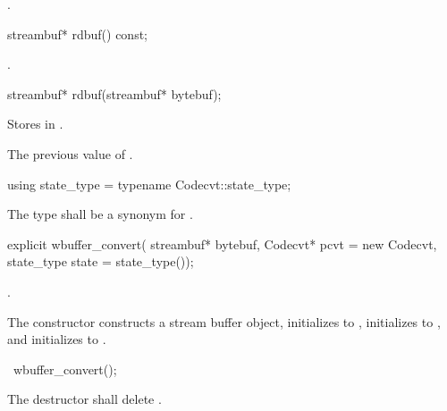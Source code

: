 \begin{itemdescr}
\pnum
\returns
{}.
\end{itemdescr}

%
\begin{itemdecl}
streambuf* rdbuf() const;
\end{itemdecl}

\begin{itemdescr}
\pnum
\returns
{}.
\end{itemdescr}

%
\begin{itemdecl}
streambuf* rdbuf(streambuf* bytebuf);
\end{itemdecl}

\begin{itemdescr}
\pnum
\effects
Stores  in .

\pnum
\returns
The previous value of .
\end{itemdescr}

%
\begin{itemdecl}
using state_type = typename Codecvt::state_type;
\end{itemdecl}

\begin{itemdescr}
\pnum
The type shall be a synonym for .
\end{itemdescr}

%
\begin{itemdecl}
explicit wbuffer_convert(
    streambuf* bytebuf,
    Codecvt* pcvt = new Codecvt,
    state_type state = state_type());
\end{itemdecl}

\begin{itemdescr}
\pnum
\requires
{}.

\pnum
\effects
The constructor constructs a stream buffer object, initializes
 to , initializes 
to , and initializes  to .
\end{itemdescr}

%
\begin{itemdecl}
~wbuffer_convert();
\end{itemdecl}

\begin{itemdescr}
\pnum
\effects
The destructor shall delete .
\end{itemdescr}

